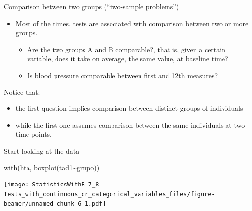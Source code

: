 \documentclass[
  ignorenonframetext,
]{beamer}
\newenvironment{Shaded}{\begin{snugshade}}{\end{snugshade}}
\newcommand{\FunctionTok}[1]{\textcolor[rgb]{0.00,0.00,0.00}{#1}}
\newcommand{\NormalTok}[1]{#1}
\newcommand{\SpecialCharTok}[1]{\textcolor[rgb]{0.00,0.00,0.00}{#1}}
\providecommand{\tightlist}{%
  \setlength{\itemsep}{0pt}\setlength{\parskip}{0pt}}
\begin{document}
\begin{frame}{Comparison between two groups (``two-sample problems'')}
\protect\hypertarget{comparison-between-two-groups-two-sample-problems}{}
\begin{itemize}
\item
  Most of the times, tests are associated with comparison between two or
  more groups.

  \begin{itemize}
  \tightlist
  \item
    Are the two groups A and B comparable?, that is, given a certain
    variable, does it take on average, the same value, at baseline time?
  \item
    Is blood pressure comparable between first and 12th measures?
  \end{itemize}
\end{itemize}

Notice that:

\begin{itemize}
\tightlist
\item
  the first question implies comparison between distinct groups of
  individuals
\item
  while the first one assumes comparison between the same individuals at
  two time points.
\end{itemize}
\end{frame}

\begin{frame}[fragile]{Start looking at the data}
\protect\hypertarget{start-looking-at-the-data}{}
\begin{Shaded}
\begin{Highlighting}[]
\FunctionTok{with}\NormalTok{(hta, }\FunctionTok{boxplot}\NormalTok{(tad1}\SpecialCharTok{\textasciitilde{}}\NormalTok{grupo))}
\end{Highlighting}
\end{Shaded}

\texttt{[image: StatisticsWithR-7\_8-Tests\_with\_continuous\_or\_categorical\_variables\_files/figure-beamer/unnamed-chunk-6-1.pdf]}
\end{frame}
\end{document}
